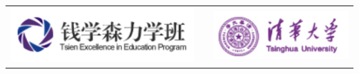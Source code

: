 \documentclass[final]{beamer}
\newlength{\onecolwid}
\begin{document}
\begin{frame}[t]
\begin{columns}[t]
\begin{column}{\onecolwid}
\begin{center}
\begin{tabular}{ccc}
\includegraphics[width=0.5\linewidth]{logo.png} & \hfill & \includegraphics[width=0.5\linewidth]{Tsinghua.png}
\end{tabular}
\end{center}


\end{column} %

\end{columns} %

\end{frame} %
\end{document}
